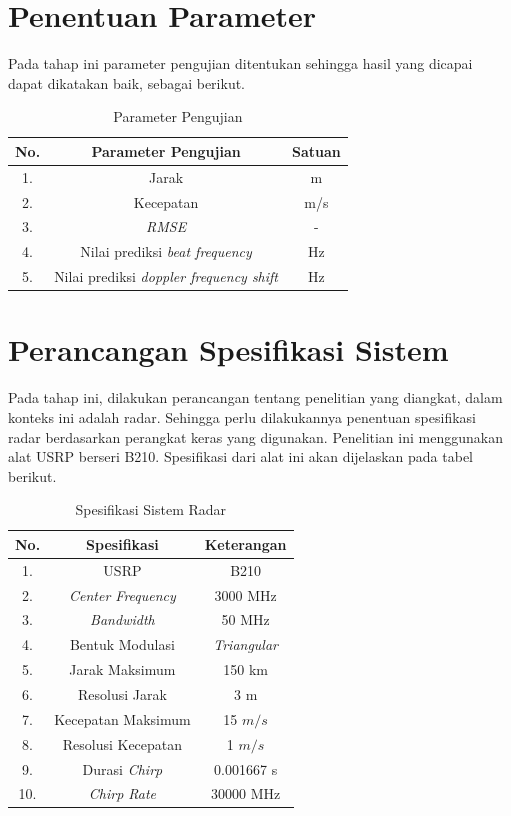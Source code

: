 \section{Penentuan Parameter}

Pada tahap ini parameter pengujian ditentukan sehingga hasil yang dicapai dapat dikatakan baik, sebagai berikut.

\begin{center}
	\begin{longtable}{| c | c | c |}
		\caption{Parameter Pengujian}
		\label{tab:paramUji}\\
		\hline
		No. & Parameter Pengujian		& Satuan\\ \hline
		1.  &Jarak	   					& m\\
		2.  &Kecepatan 					& m/s\\
		3.  &\textit{RMSE}				& -\\
		4.	&Nilai prediksi \textit{beat frequency}	& Hz \\
		5.	&Nilai prediksi \textit{doppler frequency shift} & Hz \\
		\hline
	\end{longtable}
\end{center}

\section{Perancangan Spesifikasi Sistem}
Pada tahap ini, dilakukan perancangan tentang penelitian yang diangkat, dalam konteks ini adalah radar. Sehingga perlu dilakukannya penentuan spesifikasi radar berdasarkan perangkat keras yang digunakan. Penelitian ini menggunakan alat USRP berseri B210.  Spesifikasi dari alat ini akan dijelaskan pada tabel berikut.

\begin{center}
	\begin{longtable}{| c | c | c |}
		\caption{Spesifikasi Sistem Radar}
		\label{tab:spekRadar}\\
		\hline
		No. & Spesifikasi 					& Keterangan\\\hline
		1.  & USRP 							& B210\\
		2.  & \textit{Center Frequency}  	& 3000 MHz \\
		3.  & \textit{Bandwidth} 			& 50 MHz \\
		4.	& Bentuk Modulasi				& \textit{Triangular}\\
		5.  & Jarak Maksimum 				& 150 km \\
		6.  & Resolusi Jarak 				& 3 m \\
		7.  & Kecepatan Maksimum			& 15 $m/s$ \\
		8.  & Resolusi Kecepatan 			& 1 $m/s$\\
		9.	& Durasi \textit{Chirp}			& 0.001667 s\\
		10.	& \textit{Chirp Rate}			& 30000 MHz\\
		\hline
	\end{longtable}
\end{center}

